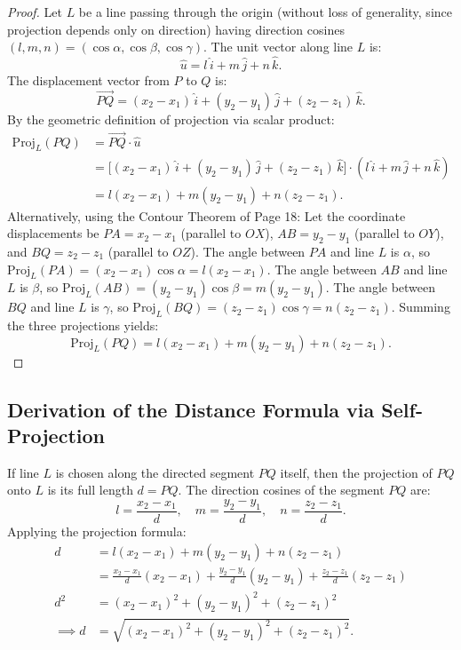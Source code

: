 \begin{proof}
Let $L$ be a line passing through the origin (without loss of generality, since projection depends only on direction) having direction cosines $(l, m, n) = (\cos\alpha, \cos\beta, \cos\gamma)$.
The unit vector along line $L$ is:
\begin{equation}
    \hat{u} = l\,\hat{i} + m\,\hat{j} + n\,\hat{k}.
\end{equation}
The displacement vector from $P$ to $Q$ is:
\begin{equation}
    \vec{PQ} = (x_2 - x_1)\,\hat{i} + (y_2 - y_1)\,\hat{j} + (z_2 - z_1)\,\hat{k}.
\end{equation}
By the geometric definition of projection via scalar product:
\begin{align}
    \text{Proj}_L(PQ) &= \vec{PQ} \cdot \hat{u} \nonumber\\
    &= \bigl[(x_2 - x_1)\,\hat{i} + (y_2 - y_1)\,\hat{j} + (z_2 - z_1)\,\hat{k}\bigr] \cdot (l\,\hat{i} + m\,\hat{j} + n\,\hat{k}) \nonumber\\
    &= l(x_2 - x_1) + m(y_2 - y_1) + n(z_2 - z_1).
\end{align}
Alternatively, using the Contour Theorem of Page 18:
Let the coordinate displacements be $PA = x_2 - x_1$ (parallel to $OX$), $AB = y_2 - y_1$ (parallel to $OY$), and $BQ = z_2 - z_1$ (parallel to $OZ$).
The angle between $PA$ and line $L$ is $\alpha$, so $\text{Proj}_L(PA) = (x_2 - x_1)\cos\alpha = l(x_2 - x_1)$.
The angle between $AB$ and line $L$ is $\beta$, so $\text{Proj}_L(AB) = (y_2 - y_1)\cos\beta = m(y_2 - y_1)$.
The angle between $BQ$ and line $L$ is $\gamma$, so $\text{Proj}_L(BQ) = (z_2 - z_1)\cos\gamma = n(z_2 - z_1)$.
Summing the three projections yields:
\begin{equation}
    \text{Proj}_L(PQ) = l(x_2 - x_1) + m(y_2 - y_1) + n(z_2 - z_1).
\end{equation}
\end{proof}

\subsection{Derivation of the Distance Formula via Self-Projection}
If line $L$ is chosen along the directed segment $PQ$ itself, then the projection of $PQ$ onto $L$ is its full length $d = PQ$.
The direction cosines of the segment $PQ$ are:
\begin{equation}
    l = \frac{x_2 - x_1}{d}, \quad m = \frac{y_2 - y_1}{d}, \quad n = \frac{z_2 - z_1}{d}.
\end{equation}
Applying the projection formula:
\begin{align}
    d &= l(x_2 - x_1) + m(y_2 - y_1) + n(z_2 - z_1) \nonumber\\
    &= \frac{x_2 - x_1}{d}(x_2 - x_1) + \frac{y_2 - y_1}{d}(y_2 - y_1) + \frac{z_2 - z_1}{d}(z_2 - z_1) \nonumber\\
    d^2 &= (x_2 - x_1)^2 + (y_2 - y_1)^2 + (z_2 - z_1)^2 \nonumber\\
    \implies d &= \sqrt{(x_2 - x_1)^2 + (y_2 - y_1)^2 + (z_2 - z_1)^2}.
\end{align}

